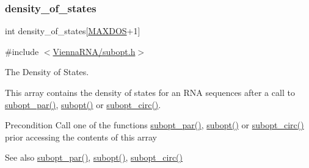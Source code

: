 \subsubsection{\texorpdfstring{density\+\_\+of\+\_\+states}{density\_of\_states}}
{\footnotesize\ttfamily int density\+\_\+of\+\_\+states\mbox{[}\hyperlink{subopt_8h_a5ec740b80afb4906ba4311dbd8ddbd89}{M\+A\+X\+D\+OS}+1\mbox{]}}



{\ttfamily \#include $<$\hyperlink{subopt_8h}{Vienna\+R\+N\+A/subopt.\+h}$>$}



The Density of States. 

This array contains the density of states for an R\+NA sequences after a call to \hyperlink{group__subopt__wuchty_gaa1e1e7031a948ebcb39a9d58d1e9842c}{subopt\+\_\+par()}, \hyperlink{group__subopt__wuchty_ga700f662506a233e42dd7fda74fafd40e}{subopt()} or \hyperlink{group__subopt__wuchty_ga8634516e4740e0b6c9a46d2bae940340}{subopt\+\_\+circ()}.

\begin{DoxyPrecond}{Precondition}
Call one of the functions \hyperlink{group__subopt__wuchty_gaa1e1e7031a948ebcb39a9d58d1e9842c}{subopt\+\_\+par()}, \hyperlink{group__subopt__wuchty_ga700f662506a233e42dd7fda74fafd40e}{subopt()} or \hyperlink{group__subopt__wuchty_ga8634516e4740e0b6c9a46d2bae940340}{subopt\+\_\+circ()} prior accessing the contents of this array 
\end{DoxyPrecond}
\begin{DoxySeeAlso}{See also}
\hyperlink{group__subopt__wuchty_gaa1e1e7031a948ebcb39a9d58d1e9842c}{subopt\+\_\+par()}, \hyperlink{group__subopt__wuchty_ga700f662506a233e42dd7fda74fafd40e}{subopt()}, \hyperlink{group__subopt__wuchty_ga8634516e4740e0b6c9a46d2bae940340}{subopt\+\_\+circ()} 
\end{DoxySeeAlso}

